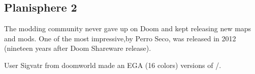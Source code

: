 \subsection{Planisphere 2}
The modding community never gave up on Doom and kept releasing new maps and mods. One of the most impressive,by  Perro Seco, was released in 2012 (nineteen years after Doom Shareware release).\\
\par
{} 
\par
{} 
\par
User Sigvatr from doomworld made an EGA (16 colors) versions of /.
 \par
 \par
